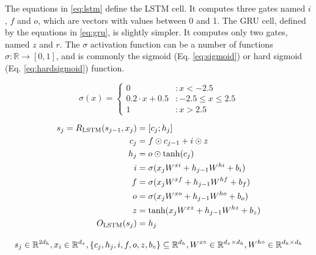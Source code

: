 The equations in \ref{eq:lstm} define the LSTM cell. It computes three gates
named $i$, $f$ and $o$, which are vectors with values between 0 and 1. The
GRU cell, defined by the equations in \ref{eq:gru}, is slightly simpler. It
computes only two gates, named $z$ and $r$. The $\sigma$ activation function
can be a number of functions $\sigma : \mathbb{R} \rightarrow [0, 1]$, and is
commonly the sigmoid (Eq. \ref{eq:sigmoid}) or hard sigmoid (Eq.
\ref{eq:hardsigmoid}) function.

\begin{equation} \label{eq:hardsigmoid}
  \sigma(x) = \begin{cases}
    0                 & : x < -2.5 \\
    0.2 \cdot x + 0.5 & : -2.5 \leq x \leq 2.5 \\
    1                 & : x > 2.5
  \end{cases}
\end{equation}

\begin{gather} \label{eq:lstm}
  \begin{split}
  s_j = R_{\text{LSTM}}(s_{j-1}, x_j) &= [c_j;h_j] \\
                           c_j &= f \odot c_{j-1} + i \odot z \\
                           h_j &= o \odot \tanh(c_j) \\
                             i &= \sigma(x_j W^{xi} + h_{j-1} W^{hi} + b_i) \\
                             f &= \sigma(x_j W^{xf} + h_{j-1} W^{hf} + b_f) \\
                             o &= \sigma(x_j W^{xo} + h_{j-1} W^{ho} + b_o) \\
                             z &= \tanh(x_j W^{xz} + h_{j-1} W^{hz} + b_z) \\
          O_{\text{LSTM}}(s_j) &= h_j
  \end{split}
  \\[2ex]
  s_j\in \mathbb{R}^{2d_h}, x_i\in \mathbb{R}^{d_x},
  \left\{c_j, h_j, i, f, o, z, b_{\circ}\right\}\subseteq \mathbb{R}^{d_h},
  W^{x\circ}\in \mathbb{R}^{d_x\times d_h},
  W^{h\circ}\in \mathbb{R}^{d_h\times d_h} \notag
\end{gather}

